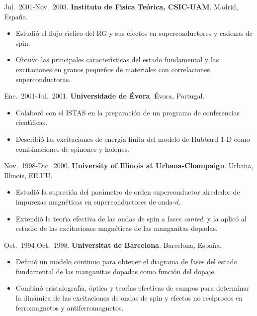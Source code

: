 \documentclass{article}
\begin{document}
Jul.~2001-Nov.~2003. 
{\bf Instituto de F\'{\i}sica Te\'orica, CSIC-UAM}. 
Madrid, Espa\~na. 

\begin{itemize}\itemsep 0pt
\item Estudi\'o el flujo c\'{\i}clico del RG y sus efectos en 
superconductores y cadenas de spin.

\item Obtuvo las principales caracter\'{\i}sticas del estado fundamental 
y las excitaciones en granos peque\~nos de materiales con correlaciones 
superconductoras.
\end{itemize}


Ene.~2001-Jul.~2001. {\bf Universidade de \'Evora}. \'Evora, Portugal.

\begin{itemize}\itemsep 0pt
\item Colabor\'o con el ISTAS en la preparaci\'on de un programa de 
conferencias cient\'{\i}ficas.

\item Describi\'{o} las excitaciones de energ\'{\i}a finita del modelo 
de Hubbard 1-D como combinaciones de spinones y holones.
\end{itemize}


Nov.~1998-Dic.~2000. {\bf University of Illinois at Urbana-Champaign}. 
Urbana, Illinois, EE.UU.

\begin{itemize}\itemsep 0pt
\item Estudi\'{o} la supresi\'{o}n del par\'{a}metro de orden superconductor 
alrededor de impurezas magn\'{e}ticas en superconductores de onda-$d$.

\item Extendi\'{o} la teor\'{\i}a efectiva de las ondas de spin 
a fases {\em canted}, y la aplic\'{o} al estudio de las excitaciones 
magn\'{e}ticas de las manganitas dopadas.
\end{itemize}

Oct.~1994-Oct.~1998. {\bf Universitat de Barcelona}. Barcelona, Espa\~na.

\begin{itemize}\itemsep 0pt
\item Defini\'{o} un modelo continuo para obtener el diagrama de fases del 
estado fundamental de las manganitas dopadas como funci\'{o}n del dopaje.

\item Combin\'{o} cristalograf\'{\i}a, \'{o}ptica y teor\'{\i}as efectivas 
de campos para determinar la din\'{a}mica de las excitaciones de ondas de 
spin y efectos no rec\'{\i}procos en ferromagnetos y antiferromagnetos.
\end{itemize}
\end{document}

